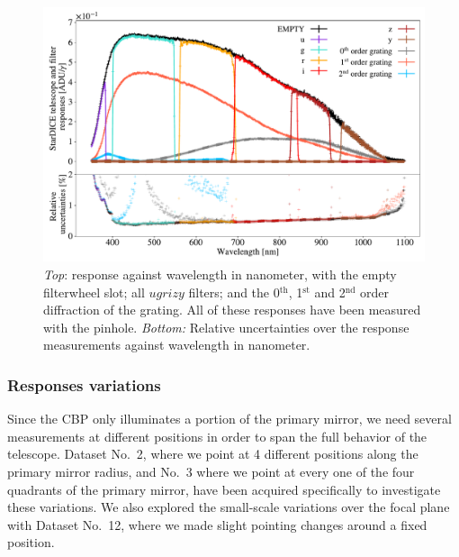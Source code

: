 \begin{figure}[h]
    \centering
    \includegraphics[width=\columnwidth]{fig/stardice_75um_response.pdf}
    \caption{\textit{Top}: \SD response against wavelength in nanometer, with the empty filterwheel slot; all $ugrizy$ filters; and the 0$^\mathrm{th}$, 1$^\mathrm{st}$ and 2$^\mathrm{nd}$ order diffraction of the grating. All of these responses have been measured with the \spinhole pinhole. \textit{Bottom:} Relative uncertainties over the \SD response measurements against wavelength in nanometer.}
    \label{fig:stardice_75um_response}
\end{figure}


\subsubsection{\SD Responses variations}

Since the CBP only illuminates a portion of the primary mirror, we need several measurements at different positions in order to span the full behavior of the \SD telescope. Dataset No.~2, where we point at 4 different positions along the primary mirror radius, and No.~3 where we point at every one of the four quadrants of the primary mirror, have been acquired specifically to investigate these variations. We also explored the small-scale variations over the focal plane with Dataset No.~12, where we made slight pointing changes around a fixed position.


